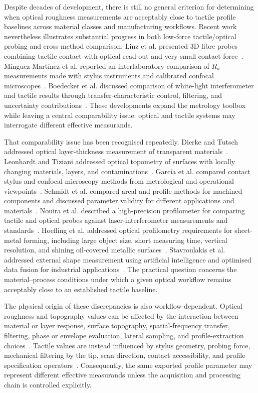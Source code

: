 \documentclass{article}
\begin{document}
Despite decades of development, there is still no general criterion for determining when optical roughness measurements are acceptably close to tactile profile baselines across material classes and manufacturing workflows. Recent work nevertheless illustrates substantial progress in both low-force tactile/optical probing and cross-method comparison. Linz et al. presented 3D fibre probes combining tactile contact with optical read-out and very small contact force~\cite{Linz2012}. M\'inguez-Mart\'inez et al. reported an interlaboratory comparison of $R_a$ measurements made with stylus instruments and calibrated confocal microscopes~\cite{mínguezmartínez2022results-794}. Boedecker et al. discussed comparison of white-light interferometer and tactile results through transfer-characteristic control, filtering, and uncertainty contributions~\cite{Boedecker2010}. These developments expand the metrology toolbox while leaving a central comparability issue: optical and tactile systems may interrogate different effective measurands.

That comparability issue has been recognised repeatedly. Dierke and Tutsch addressed optical layer-thickness measurement of transparent materials~\cite{Dierke2012LayerThickness}. Leonhardt and Tiziani addressed optical topometry of surfaces with locally changing materials, layers, and contaminations~\cite{Leonhardt1999Topometry}. Garc\'ia et al. compared contact stylus and confocal microscopy methods from metrological and operational viewpoints~\cite{Garcia2018}. Schmidt et al. compared areal and profile methods for machined components and discussed parameter validity for different applications and materials~\cite{Schmidt2021459}. Nouira et al. described a high-precision profilometer for comparing tactile and optical probes against laser-interferometer measurements and standards~\cite{Nouira2014a}. Hoefling et al. addressed optical profilometry requirements for sheet-metal forming, including large object size, short measuring time, vertical resolution, and shining oil-covered metallic surfaces~\cite{Hoefling1999338}. Stavroulakis et al. addressed external shape measurement using artificial intelligence and optimised data fusion for industrial applications~\cite{Stavroulakis2018DataFusion}. The practical question concerns the material--process conditions under which a given optical workflow remains acceptably close to an established tactile baseline.

The physical origin of these discrepancies is also workflow-dependent. Optical roughness and topography values can be affected by the interaction between material or layer response, surface topography, spatial-frequency transfer, filtering, phase or envelope evaluation, lateral sampling, and profile-extraction choices~\cite{Dierke2012LayerThickness,Leonhardt1999Topometry,Boedecker2010,Tiziani1999324,Garcia2018}. Tactile values are instead influenced by stylus geometry, probing force, mechanical filtering by the tip, scan direction, contact accessibility, and profile specification operators~\cite{ISO3274-1996,ISO21920-3-2021,ISO16610-21-2011}. Consequently, the same exported profile parameter may represent different effective measurands unless the acquisition and processing chain is controlled explicitly.
\end{document}
